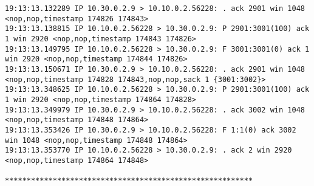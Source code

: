 \documentclass[a4paper,12pt]{article}
\begin{document}
\begin{lstlisting}
19:13:13.132289 IP 10.30.0.2.9 > 10.10.0.2.56228: . ack 2901 win 1048 <nop,nop,timestamp 174826 174843>
19:13:13.138815 IP 10.10.0.2.56228 > 10.30.0.2.9: P 2901:3001(100) ack 1 win 2920 <nop,nop,timestamp 174843 174826>
19:13:13.149795 IP 10.10.0.2.56228 > 10.30.0.2.9: F 3001:3001(0) ack 1 win 2920 <nop,nop,timestamp 174844 174826>
19:13:13.150671 IP 10.30.0.2.9 > 10.10.0.2.56228: . ack 2901 win 1048 <nop,nop,timestamp 174828 174843,nop,nop,sack 1 {3001:3002}>
19:13:13.348625 IP 10.10.0.2.56228 > 10.30.0.2.9: P 2901:3001(100) ack 1 win 2920 <nop,nop,timestamp 174864 174828>
19:13:13.349979 IP 10.30.0.2.9 > 10.10.0.2.56228: . ack 3002 win 1048 <nop,nop,timestamp 174848 174864>
19:13:13.353426 IP 10.30.0.2.9 > 10.10.0.2.56228: F 1:1(0) ack 3002 win 1048 <nop,nop,timestamp 174848 174864>
19:13:13.353770 IP 10.10.0.2.56228 > 10.30.0.2.9: . ack 2 win 2920 <nop,nop,timestamp 174864 174848>

*********************************************************


\end{lstlisting}
\end{document}
